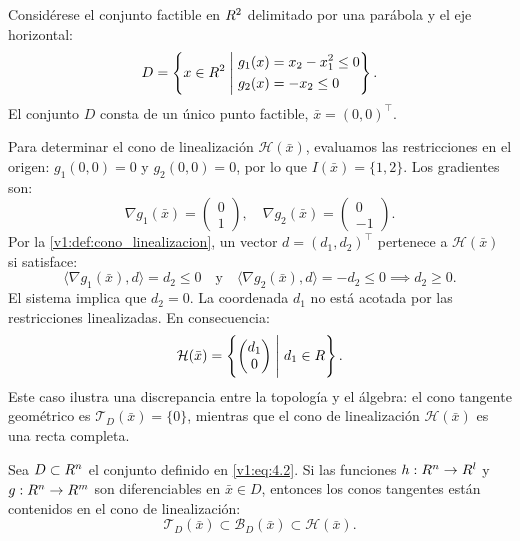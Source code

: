 \begin{example}\label{v1:exa:calculo_cono_linealizacion}
 Considérese el conjunto factible en $R^2$ delimitado por una parábola y el eje horizontal:
 \[
 D = \left\{ x \in R^2 \mathrel{\Bigg|} \begin{aligned} &g_1(x) = x_2 - x_1^2 \le 0 \\ &g_2(x) = -x_2 \le 0 \end{aligned} \right\}.
 \]
 El conjunto $D$ consta de un único punto factible, $\bar{x} = (0,0)^\top$.
 
 Para determinar el cono de linealización $\mathcal{H}(\bar{x})$, evaluamos las restricciones en el origen: $g_1(0,0) = 0$ y $g_2(0,0) = 0$, por lo que $I(\bar{x}) = \{1, 2\}$. Los gradientes son:
 \[
 \nabla g_1(\bar{x}) = \begin{pmatrix} 0 \\ 1 \end{pmatrix}, \quad \nabla g_2(\bar{x}) = \begin{pmatrix} 0 \\ -1 \end{pmatrix}.
 \]
 Por la \cref{v1:def:cono_linealizacion}, un vector $d = (d_1, d_2)^\top$ pertenece a $\mathcal{H}(\bar{x})$ si satisface:
 \[
 \langle \nabla g_1(\bar{x}), d \rangle = d_2 \le 0 \quad \text{y} \quad \langle \nabla g_2(\bar{x}), d \rangle = -d_2 \le 0 \implies d_2 \ge 0.
 \]
 El sistema implica que $d_2 = 0$. La coordenada $d_1$ no está acotada por las restricciones linealizadas. En consecuencia:
 \[
 \mathcal{H}(\bar{x}) = \left\{ \begin{pmatrix} d_1 \\ 0 \end{pmatrix} \mathrel{\Bigg|} d_1 \in R \right\}.
 \]
 Este caso ilustra una discrepancia entre la topología y el álgebra: el cono tangente geométrico es $\mathcal{T}_D(\bar{x}) = \{0\}$, mientras que el cono de linealización $\mathcal{H}(\bar{x})$ es una recta completa.
\end{example}

\begin{proposition}\label{v1:prop:4.1.1}
 Sea $D \subset R^n$ el conjunto definido en \eqref{v1:eq:4.2}. Si las funciones $h : R^n \to R^l$ y $g : R^n \to R^m$ son diferenciables en $\bar{x} \in D$, entonces los conos tangentes están contenidos en el cono de linealización:
 \[
 \mathcal{T}_D(\bar{x}) \subset \mathcal{B}_D(\bar{x}) \subset \mathcal{H}(\bar{x}).
 \]
\end{proposition}

